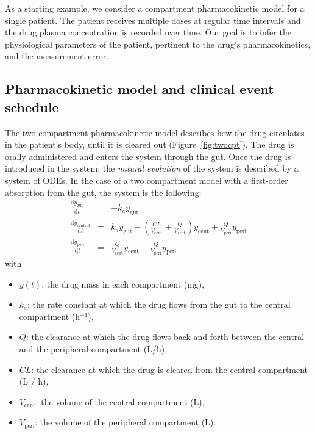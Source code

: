 
As a starting example, we consider a compartment pharmacokinetic model for a single patient.
The patient receives multiple doses at regular time intervals and the drug plasma concentration is recorded over time.
Our goal is to infer the physiological parameters of the patient, pertinent to the drug's pharmacokinetics, and the measurement error.

\subsection{Pharmacokinetic model and clinical event schedule} 

The two compartment pharmacokinetic model describes how the drug circulates in the patient's body, until it is cleared out (Figure~\ref{fig:twocpt}).
The drug is orally administered and enters the system through the gut.
Once the drug is introduced in the system, the \textit{natural evolution} of the system is described by a system of ODEs.
In the case of a two compartment model with a first-order absorption from the gut, the system is the following:
%
\begin{eqnarray*}
  \frac{\mathrm d y_\mathrm{gut}}{\mathrm d t} & = & - k_a y_\mathrm{gut} \\ 
  \frac{\mathrm d y_\mathrm{central}}{\mathrm d t} & = & k_a y_\mathrm{gut} - \left (\frac{CL}{V_\mathrm{cent}} + \frac{Q}{V_\mathrm{cent}} \right) y_\mathrm{cent} + \frac{Q}{V_\mathrm{peri}} y_\mathrm{peri} \\
  \frac{\mathrm d y_\mathrm{peri}}{\mathrm d t} & = & \frac{Q}{V_\mathrm{cent}} y_\mathrm{cent} - \frac{Q}{V_\mathrm{peri}} y_\mathrm{peri}
\end{eqnarray*}
%
with
\begin{itemize}
  \setlength\itemsep{0em}
  \item $y(t)$: the drug mass in each compartment (mg),
  \item $k_a$: the rate constant at which the drug flows from the gut to the central compartment (h$^{-1}$),
  \item $Q$: the clearance at which the drug flows back and forth between the central and the peripheral compartment (L/h),
  \item $CL$: the clearance at which the drug is cleared from the central compartment (L / h),
  \item $V_\mathrm{cent}$: the volume of the central compartment (L),
  \item $V_\mathrm{peri}$: the volume of the peripheral compartment (L).
\end{itemize}

